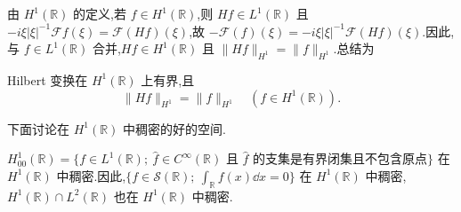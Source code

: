 由 $H^{1}(\mathbb{R})$ 的定义,若 $f \in H^{1}(\mathbb{R})$,则 $Hf \in L^{1}(\mathbb{R})$ 且 $-i\xi|\xi|^{-1}\mathcal{F}f(\xi) = \mathcal{F}(Hf)(\xi)$,故 $-\mathcal{F}(f)(\xi) = -i\xi|\xi|^{-1}\mathcal{F}(Hf)(\xi)$.因此,与 $f \in L^{1}(\mathbb{R})$ 合并,$Hf \in H^{1}(\mathbb{R})$ 且 $\| Hf \|_{H^{1}} = \| f \|_{H^{1}}$.总结为

\begin{theorem}\label{thm:1.12.3}
Hilbert 变换在 $H^{1}(\mathbb{R})$ 上有界,且
\begin{equation*}
\| Hf \|_{H^{1}} = \| f \|_{H^{1}} \quad (f \in H^{1}(\mathbb{R})).
\end{equation*}
\end{theorem}

下面讨论在 $H^{1}(\mathbb{R})$ 中稠密的好的空间.

\begin{lemma}\label{lem:1.12.4}
$H_{00}^{1}(\mathbb{R}) = \{f \in L^{1}(\mathbb{R});\ \hat{f} \in C^{\infty}(\mathbb{R}) \text{ 且 } \hat{f} \text{ 的支集是有界闭集且不包含原点}\}$ 在 $H^{1}(\mathbb{R})$ 中稠密.因此,$\{f \in \mathcal{S}(\mathbb{R});\ \int_{\mathbb{R}}f(x)\dd x = 0\}$ 在 $H^{1}(\mathbb{R})$ 中稠密,$H^{1}(\mathbb{R}) \cap L^{2}(\mathbb{R})$ 也在 $H^{1}(\mathbb{R})$ 中稠密.
\end{lemma}

